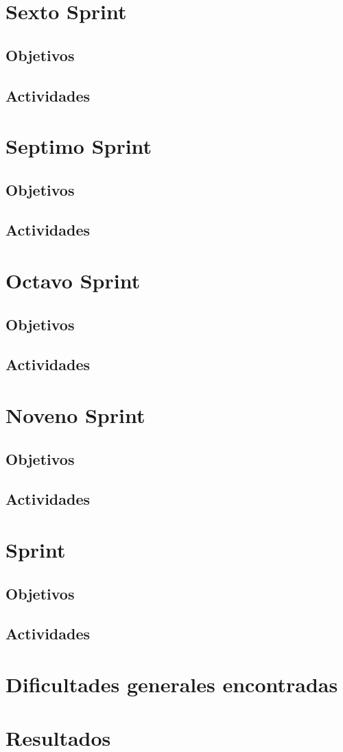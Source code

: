     \section{Sexto Sprint}
        \subsection{Objetivos}
        \subsection{Actividades}
        
    \section{Septimo Sprint}
        \subsection{Objetivos}
        \subsection{Actividades}
        
    \section{Octavo Sprint}
        \subsection{Objetivos}
        \subsection{Actividades}
        
    \section{Noveno Sprint}
        \subsection{Objetivos}
        \subsection{Actividades}
        
    \section{Sprint}
        \subsection{Objetivos}
        \subsection{Actividades}
        
    \section{Dificultades generales encontradas}
    \section{Resultados}
\pagebreak